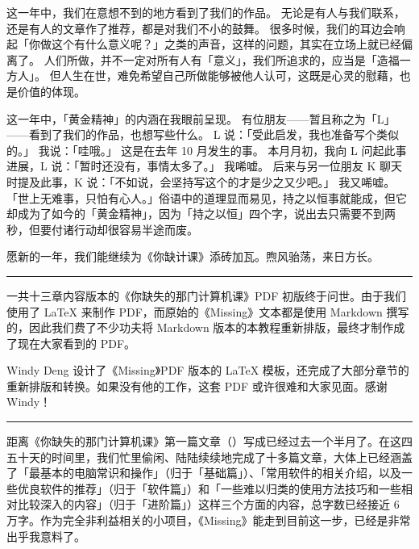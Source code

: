 这一年中，我们在意想不到的地方看到了我们的作品。
无论是有人与我们联系，还是有人的文章作了推荐，都是对我们不小的鼓舞。
很多时候，我们的耳边会响起「你做这个有什么意义呢？」之类的声音，这样的问题，其实在立场上就已经偏离了。
人们所做，并不一定对所有人有「意义」，我们所追求的，应当是「造福一方人」。
但人生在世，难免希望自己所做能够被他人认可，这既是心灵的慰藉，也是价值的体现。

这一年中，「黄金精神」的内涵在我眼前呈现。
有位朋友——暂且称之为「L」——看到了我们的作品，也想写些什么。
L 说：「受此启发，我也准备写个类似的。」
我说：「哇哦。」
这是在去年 10 月发生的事。
本月月初，我向 L 问起此事进展，L 说：「暂时还没有，事情太多了。」
我唏嘘。
后来与另一位朋友 K 聊天时提及此事，K 说：「不如说，会坚持写这个的才是少之又少吧。」
我又唏嘘。
「世上无难事，只怕有心人。」俗语中的道理显而易见，持之以恒事就能成，但它却成为了如今的「黄金精神」，因为「持之以恒」四个字，说出去只需要不到两秒，但要付诸行动却很容易半途而废。

愿新的一年，我们能继续为《你缺计课》添砖加瓦。煦风骀荡，来日方长。


\begin{center}\rule{0.5\linewidth}{0.5pt}\end{center}

一共十三章内容版本的《你缺失的那门计算机课》PDF 初版终于问世。由于我们使用了 \LaTeX{} 来制作 PDF，而原始的《Missing》文本都是使用 Markdown 撰写的，因此我们费了不少功夫将 Markdown 版本的本教程重新排版，最终才制作成了现在大家看到的 PDF。

Windy Deng 设计了《Missing》PDF 版本的 \LaTeX{} 模板，还完成了大部分章节的重新排版和转换。如果没有他的工作，这套 PDF 或许很难和大家见面。感谢 Windy！


\begin{center}\rule{0.5\linewidth}{0.5pt}\end{center}

距离《你缺失的那门计算机课》第一篇文章（）写成已经过去一个半月了。在这四五十天的时间里，我们忙里偷闲、陆陆续续地完成了十多篇文章，大体上已经涵盖了「最基本的电脑常识和操作」（归于「基础篇」）、「常用软件的相关介绍，以及一些优良软件的推荐」（归于「软件篇」）和「一些难以归类的使用方法技巧和一些相对比较深入的内容」（归于「进阶篇」）这样三个方面的内容，总字数已经接近 6 万字。作为完全非利益相关的小项目，《Missing》能走到目前这一步，已经是非常出乎我意料了。

